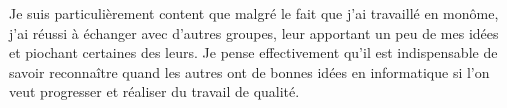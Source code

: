 \documentclass[12pt]{article}
\begin{document}
Je suis particulièrement content que malgré le fait que j'ai travaillé en
monôme, j'ai réussi à échanger avec d'autres groupes, leur apportant un peu
de mes idées et piochant certaines des leurs. Je pense effectivement qu'il
est indispensable de savoir reconnaître quand les autres ont de bonnes idées
en informatique si l'on veut progresser et réaliser du travail de qualité.
\end{document}
